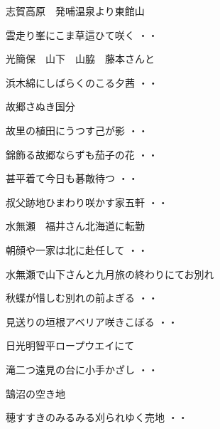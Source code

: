 \vspace{ 0.4cm}
志賀高原　発哺温泉より東館山
\begin{shiika}雲走り峯にこま草這ひて咲く
\hfill{・・}\end{shiika}
\vspace{ 0.4cm}
光簡保　山下　山脇　藤本さんと
\begin{shiika}浜木綿にしばらくのこる夕茜
\hfill{・・}\end{shiika}
\vspace{ 0.4cm}
故郷さぬき国分
\begin{shiika}故里の植田にうつす己が影
\hfill{・・}\end{shiika}
\begin{shiika}錦飾る故郷ならずも茄子の花
\hfill{・・}\end{shiika}
\begin{shiika}甚平着て今日も碁敵待つ
\hfill{・・}\end{shiika}
\begin{shiika}叔父跡地ひまわり咲かす家五軒
\hfill{・・}\end{shiika}
\vspace{ 0.4cm}
水無瀬　福井さん北海道に転勤
\begin{shiika}朝顔や一家は北に赴任して
\hfill{・・}\end{shiika}
\vspace{ 0.4cm}
水無瀬で山下さんと九月旅の終わりにてお別れ
\begin{shiika}秋蝶が惜しむ別れの前よぎる
\hfill{・・}\end{shiika}
\vspace{ 0.4cm}
\begin{shiika}見送りの垣根アベリア咲きこぼる
\hfill{・・}\end{shiika}
\vspace{ 0.4cm}
日光明智平ロープウエイにて
\begin{shiika}滝二つ遠見の台に小手かざし
\hfill{・・}\end{shiika}
\vspace{ 0.4cm}
鵠沼の空き地
\begin{shiika}穂すすきのみるみる刈られゆく売地
\hfill{・・}\end{shiika}
